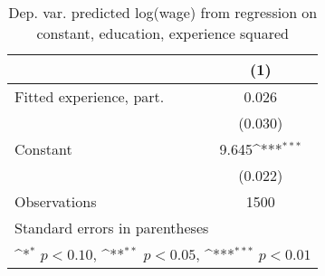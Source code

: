 \begin{table}[htbp]\centering
\def\sym#1{\ifmmode^{#1}\else\(^{#1}\)\fi}
\caption{Dep. var. predicted log(wage) from regression on constant, education, experience squared \label{reg5}}
\begin{tabular}{l*{1}{c}}
\toprule
                    &\multicolumn{1}{c}{(1)}         \\
\midrule
Fitted experience, part.&       0.026         \\
                    &     (0.030)         \\
\addlinespace
Constant            &       9.645\sym{***}\\
                    &     (0.022)         \\
\midrule
Observations        &        1500         \\
\bottomrule
\multicolumn{2}{l}{\footnotesize Standard errors in parentheses}\\
\multicolumn{2}{l}{\footnotesize \sym{*} \(p<0.10\), \sym{**} \(p<0.05\), \sym{***} \(p<0.01\)}\\
\end{tabular}
\end{table}
